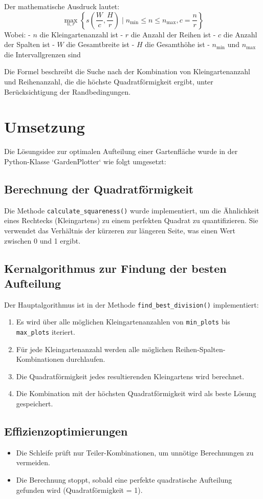 \documentclass[a4paper,10pt,ngerman]{scrartcl}
\begin{document}
Der mathematische Ausdruck lautet:
$$
\max_{n,r} \left\{ s\left( \frac{W}{c}, \frac{H}{r} \right) \mid n_{\min} \leq n \leq n_{\max}, c = \frac{n}{r} \right\}
$$
Wobei:
- $n$ die Kleingartenanzahl ist
- $r$ die Anzahl der Reihen ist
- $c$ die Anzahl der Spalten ist
- $W$ die Gesamtbreite ist
- $H$ die Gesamthöhe ist
- $n_{\min}$ und $n_{\max}$ die Intervallgrenzen sind

Die Formel beschreibt die Suche nach der Kombination von Kleingartenanzahl und Reihenanzahl, die die höchste Quadratförmigkeit ergibt, unter Berücksichtigung der Randbedingungen.

\section{Umsetzung}

Die Lösungsidee zur optimalen Aufteilung einer Gartenfläche wurde in der Python-Klasse `GardenPlotter` wie folgt umgesetzt:

\subsection{Berechnung der Quadratförmigkeit}
Die Methode \texttt{calculate\_squareness()} wurde implementiert, um die Ähnlichkeit eines Rechtecks (Kleingartens) zu einem perfekten Quadrat zu quantifizieren. Sie verwendet das Verhältnis der kürzeren zur längeren Seite, was einen Wert zwischen 0 und 1 ergibt.

\subsection{Kernalgorithmus zur Findung der besten Aufteilung}
Der Hauptalgorithmus ist in der Methode \texttt{find\_best\_division()} implementiert:

\begin{enumerate}
  \item Es wird über alle möglichen Kleingartenanzahlen von \texttt{min\_plots} bis \texttt{max\_plots} iteriert.
  \item Für jede Kleingartenanzahl werden alle möglichen Reihen-Spalten-Kombinationen durchlaufen.
  \item Die Quadratförmigkeit jedes resultierenden Kleingartens wird berechnet.
  \item Die Kombination mit der höchsten Quadratförmigkeit wird als beste Lösung gespeichert.
\end{enumerate}

\subsection{Effizienzoptimierungen}
\begin{itemize}
  \item Die Schleife prüft nur Teiler-Kombinationen, um unnötige Berechnungen zu vermeiden.
  \item Die Berechnung stoppt, sobald eine perfekte quadratische Aufteilung gefunden wird (Quadratförmigkeit = 1).
\end{itemize}
\end{document}
